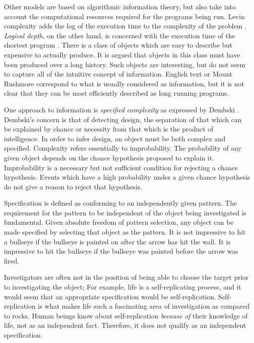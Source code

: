 Other models are based on algorithmic information theory, but also take into account the computational resources required for the programs being run.
Levin complexity adds the log of the execution time to the complexity of the problem \citep{Levin1976}.
\textit{Logical depth}, on the other hand, is concerned with the execution time of the shortest program \citep{Bennett1988}.
There is a class of objects which are easy to describe but expensive to actually produce.
It is argued \citep{Bennett1988} that objects in this class must have been produced over a long history.
Such objects are interesting, but do not seem to capture all of the intuitive concept of information.
English text or Mount Rushmore correspond to what is usually considered as information, but it is not clear that they can be most efficiently described as long running programs.

One approach to information is \textit{specified complexity} as expressed by Dembski \citep{Dembski1998}.
Dembski's concern is that of detecting design, the separation of that which can be explained by chance or necessity from that which is the product of intelligence. 
In order to infer design, an object must be both complex and specified.
Complexity refers essentially to improbability.
The probability of any given object depends on the chance hypothesis proposed to explain it.
Improbability is a necessary but not sufficient condition for rejecting a chance hypothesis.
Events which have a high probability under a given chance hypothesis do not give a reason to reject that hypothesis.

Specification is defined as conforming to an independently given pattern.
The requirement for the pattern to be independent of the object being investigated is fundamental.
Given absolute freedom of pattern selection, any object can be made specified by selecting that object as the pattern.
It is not impressive to hit a bullseye if the bullseye is painted on after the arrow has hit the wall.
It is impressive to hit the bullseye if the bullseye was painted before the arrow was fired.

Investigators are often not in the position of being able to choose the target prior to investigating the object;
For example, life is a self-replicating process, and it would seem that an appropriate specification would be self-replication.
Self-replication is what makes life such a fascinating area of investigation as compared to rocks.
Human beings know about self-replication \emph{because of} their knowledge of life, not as an independent fact.
Therefore, it does not qualify as an independent specification.

